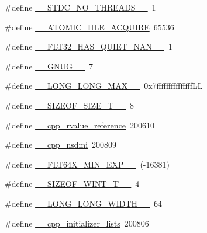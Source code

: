 \begin{DoxyCompactItemize}
\item 
\#define \hyperlink{cmake-build-debug_2babel__client__autogen_2moc__predefs_8h_a80dc30fae2c51e5db5b4f5eb7400cd1a}{\+\_\+\+\_\+\+S\+T\+D\+C\+\_\+\+N\+O\+\_\+\+T\+H\+R\+E\+A\+D\+S\+\_\+\+\_\+}~1
\item 
\#define \hyperlink{cmake-build-debug_2babel__client__autogen_2moc__predefs_8h_ac227f24525ec0825a758b2eb0869dc8f}{\+\_\+\+\_\+\+A\+T\+O\+M\+I\+C\+\_\+\+H\+L\+E\+\_\+\+A\+C\+Q\+U\+I\+RE}~65536
\item 
\#define \hyperlink{cmake-build-debug_2babel__client__autogen_2moc__predefs_8h_a22791bdfea523b20c18eff848609fa9d}{\+\_\+\+\_\+\+F\+L\+T32\+\_\+\+H\+A\+S\+\_\+\+Q\+U\+I\+E\+T\+\_\+\+N\+A\+N\+\_\+\+\_\+}~1
\item 
\#define \hyperlink{cmake-build-debug_2babel__client__autogen_2moc__predefs_8h_ae7afb460abc6122c6a5f206d78bcae4e}{\+\_\+\+\_\+\+G\+N\+U\+G\+\_\+\+\_\+}~7
\item 
\#define \hyperlink{cmake-build-debug_2babel__client__autogen_2moc__predefs_8h_a9bed0d0b1893211f857ad76d6728ea7e}{\+\_\+\+\_\+\+L\+O\+N\+G\+\_\+\+L\+O\+N\+G\+\_\+\+M\+A\+X\+\_\+\+\_\+}~0x7fffffffffffffff\+LL
\item 
\#define \hyperlink{cmake-build-debug_2babel__client__autogen_2moc__predefs_8h_ab6eb3d66486ef05ac7f1d489bfc675b4}{\+\_\+\+\_\+\+S\+I\+Z\+E\+O\+F\+\_\+\+S\+I\+Z\+E\+\_\+\+T\+\_\+\+\_\+}~8
\item 
\#define \hyperlink{cmake-build-debug_2babel__client__autogen_2moc__predefs_8h_a6e4065bb57fe77e1d8635f8108bf3c64}{\+\_\+\+\_\+cpp\+\_\+rvalue\+\_\+reference}~200610
\item 
\#define \hyperlink{cmake-build-debug_2babel__client__autogen_2moc__predefs_8h_adeecd09fc579ff3f8222cf8ae581b936}{\+\_\+\+\_\+cpp\+\_\+nsdmi}~200809
\item 
\#define \hyperlink{cmake-build-debug_2babel__client__autogen_2moc__predefs_8h_a287cbae3fb7eb2bdc8906729897524c9}{\+\_\+\+\_\+\+F\+L\+T64\+X\+\_\+\+M\+I\+N\+\_\+\+E\+X\+P\+\_\+\+\_\+}~(-\/16381)
\item 
\#define \hyperlink{cmake-build-debug_2babel__client__autogen_2moc__predefs_8h_a808f04c28bb0ef2d6b77dd66564ad351}{\+\_\+\+\_\+\+S\+I\+Z\+E\+O\+F\+\_\+\+W\+I\+N\+T\+\_\+\+T\+\_\+\+\_\+}~4
\item 
\#define \hyperlink{cmake-build-debug_2babel__client__autogen_2moc__predefs_8h_a895181efde95bdfb3489ba3018c48582}{\+\_\+\+\_\+\+L\+O\+N\+G\+\_\+\+L\+O\+N\+G\+\_\+\+W\+I\+D\+T\+H\+\_\+\+\_\+}~64
\item 
\#define \hyperlink{cmake-build-debug_2babel__client__autogen_2moc__predefs_8h_a2b46de6050feed05210bef65feef9c42}{\+\_\+\+\_\+cpp\+\_\+initializer\+\_\+lists}~200806

\end{DoxyCompactItemize}
